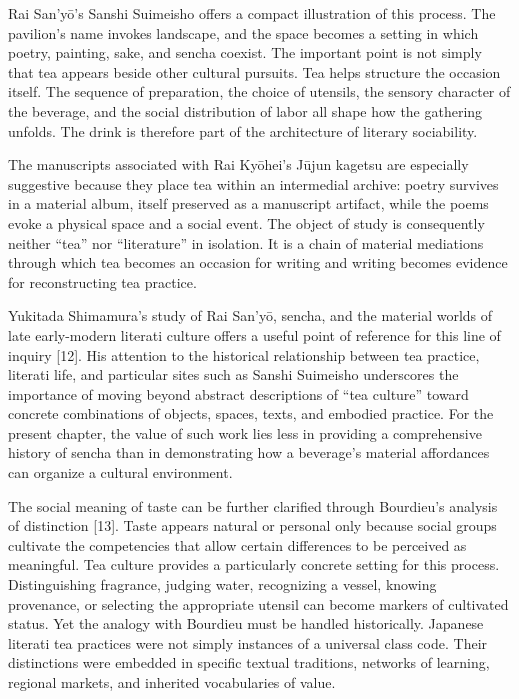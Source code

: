 \documentclass[11pt,a4paper]{article}
\begin{document}
Rai San'yō's Sanshi Suimeisho offers a compact illustration of this process. The pavilion's name invokes landscape, and the space becomes a setting in which poetry, painting, sake, and sencha coexist. The important point is not simply that tea appears beside other cultural pursuits. Tea helps structure the occasion itself. The sequence of preparation, the choice of utensils, the sensory character of the beverage, and the social distribution of labor all shape how the gathering unfolds. The drink is therefore part of the architecture of literary sociability.

The manuscripts associated with Rai Kyōhei's Jūjun kagetsu are especially suggestive because they place tea within an intermedial archive: poetry survives in a material album, itself preserved as a manuscript artifact, while the poems evoke a physical space and a social event. The object of study is consequently neither ``tea'' nor ``literature'' in isolation. It is a chain of material mediations through which tea becomes an occasion for writing and writing becomes evidence for reconstructing tea practice.

Yukitada Shimamura's study of Rai San'yō, sencha, and the material worlds of late early-modern literati culture offers a useful point of reference for this line of inquiry [12]. His attention to the historical relationship between tea practice, literati life, and particular sites such as Sanshi Suimeisho underscores the importance of moving beyond abstract descriptions of ``tea culture'' toward concrete combinations of objects, spaces, texts, and embodied practice. For the present chapter, the value of such work lies less in providing a comprehensive history of sencha than in demonstrating how a beverage's material affordances can organize a cultural environment.

The social meaning of taste can be further clarified through Bourdieu's analysis of distinction [13]. Taste appears natural or personal only because social groups cultivate the competencies that allow certain differences to be perceived as meaningful. Tea culture provides a particularly concrete setting for this process. Distinguishing fragrance, judging water, recognizing a vessel, knowing provenance, or selecting the appropriate utensil can become markers of cultivated status. Yet the analogy with Bourdieu must be handled historically. Japanese literati tea practices were not simply instances of a universal class code. Their distinctions were embedded in specific textual traditions, networks of learning, regional markets, and inherited vocabularies of value.
\end{document}
